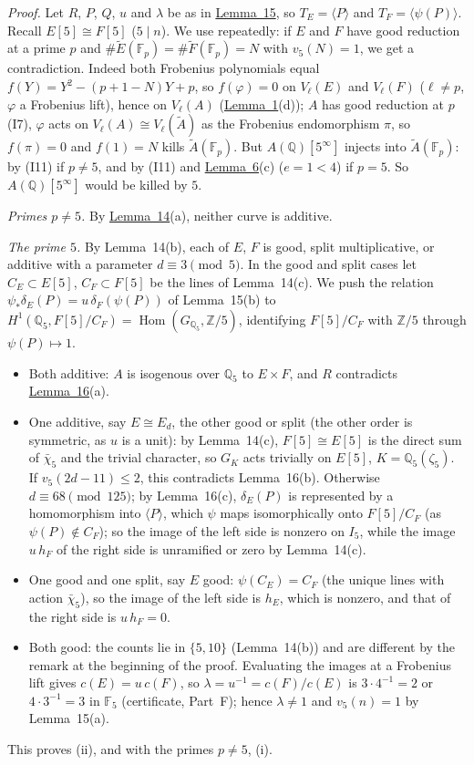 \documentclass[11pt]{article}
\newcommand{\Q}{\mathbb Q}
\newcommand{\Z}{\mathbb Z}
\newcommand{\F}{\mathbb F}
\DeclareMathOperator{\Hom}{Hom}
\begin{document}
\emph{Proof.} Let \(R\), \(P\), \(Q\), \(u\) and \(\lambda\) be as in \hyperref[lemma-kummer]{Lemma~15}, so \(T_E=
\langle P\rangle\) and \(T_F=\langle\psi(P)\rangle\). Recall \(E[5]\cong F[5]\) (\(5\mid n\)). We use repeatedly:
if \(E\) and \(F\) have good reduction at a prime \(p\) and \(\#\widetilde E(\F_p)=\#\widetilde F(\F_p)=N\) with
\(v_5(N)=1\), we get a contradiction. Indeed both Frobenius polynomials equal \(f(Y)=Y^2-(p+1-N)Y+p\), so
\(f(\varphi)=0\) on \(V_\ell(E)\) and \(V_\ell(F)\) (\(\ell\neq p\), \(\varphi\) a Frobenius lift), hence on
\(V_\ell(A)\) (\hyperref[lemma-gluing]{Lemma~1}(d)); \(A\) has good reduction at \(p\) (I7), \(\varphi\) acts on
\(V_\ell(A)\cong V_\ell(\widetilde A)\) as the Frobenius endomorphism \(\pi\), so \(f(\pi)=0\) and \(f(1)=N\) kills
\(\widetilde A(\F_p)\). But \(A(\Q)[5^\infty]\) injects into \(\widetilde A(\F_p)\): by (I11) if \(p\neq5\), and by
(I11) and \hyperref[lemma-formal]{Lemma~6}(c) (\(e=1<4\)) if \(p=5\). So \(A(\Q)[5^\infty]\) would be killed by \(5\).

\emph{Primes \(p\neq5\).} By \hyperref[lemma-five]{Lemma~14}(a), neither curve is additive.

\emph{The prime \(5\).} By Lemma~14(b), each of \(E\), \(F\) is good, split multiplicative, or additive with a
parameter \(d\equiv3\pmod5\). In the good and split cases let \(C_E\subset E[5]\), \(C_F\subset F[5]\) be the lines of
Lemma~14(c). We push the relation \(\psi_*\delta_E(P)=u\,\delta_F(\psi(P))\) of Lemma~15(b) to
\(H^1(\Q_5,F[5]/C_F)=\Hom(G_{\Q_5},\Z/5)\), identifying \(F[5]/C_F\) with \(\Z/5\) through \(\psi(P)\mapsto1\).
\begin{itemize}
\item Both additive: \(A\) is isogenous over \(\Q_5\) to \(E\times F\), and \(R\) contradicts
\hyperref[lemma-additive]{Lemma~16}(a).
\item One additive, say \(E\cong E_d\), the other good or split (the other order is symmetric, as \(u\) is a unit):
by Lemma~14(c), \(F[5]\cong E[5]\) is the direct sum of \(\bar\chi_5\) and the trivial character, so \(G_K\) acts
trivially on \(E[5]\), \(K=\Q_5(\zeta_5)\). If \(v_5(2d-11)\le2\), this contradicts Lemma~16(b). Otherwise
\(d\equiv68\pmod{125}\); by Lemma~16(c), \(\delta_E(P)\) is represented by a homomorphism into \(\langle P\rangle\),
which \(\psi\) maps isomorphically onto \(F[5]/C_F\) (as \(\psi(P)\notin C_F\)); so the image of the left side is
nonzero on \(I_5\), while the image \(u\,h_F\) of the right side is unramified or zero by Lemma~14(c).
\item One good and one split, say \(E\) good: \(\psi(C_E)=C_F\) (the unique lines with action \(\bar\chi_5\)), so the
image of the left side is \(h_E\), which is nonzero, and that of the right side is \(u\,h_F=0\).
\item Both good: the counts lie in \(\{5,10\}\) (Lemma~14(b)) and are different by the remark at the beginning of
the proof. Evaluating the images at a Frobenius lift gives \(c(E)=u\,c(F)\), so \(\lambda=u^{-1}=c(F)/c(E)\) is
\(3\cdot4^{-1}=2\) or \(4\cdot3^{-1}=3\) in \(\F_5\) (certificate, Part~F); hence \(\lambda\neq1\) and \(v_5(n)=1\)
by Lemma~15(a).
\end{itemize}
This proves (ii), and with the primes \(p\neq5\), (i).
\end{document}
